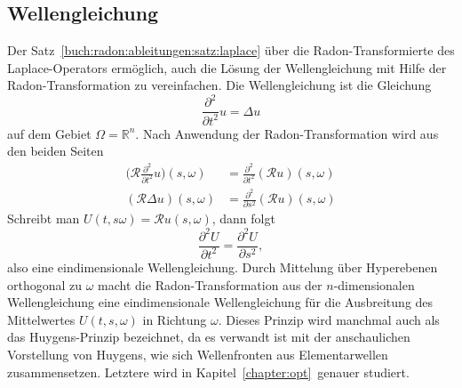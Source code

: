 \subsection{Wellengleichung
\label{buch:radon:ableitungen:subsection:wellengleichung}}
Der Satz~\ref{buch:radon:ableitungen:satz:laplace} über die
Radon-Transformierte des Laplace-Operators ermöglich, auch die
Lösung der Wellengleichung mit Hilfe der Radon-Transformation zu
vereinfachen.
Die Wellengleichung ist die Gleichung
\[
\frac{\partial^2}{\partial t^2}u = \Delta u
\]
auf dem Gebiet $\Omega=\mathbb{R}^n$.
Nach Anwendung der Radon-Transformation wird aus den beiden Seiten
\begin{align*}
\biggl(\mathscr{R}\frac{\partial^2}{\partial t^2}u\biggr)(s,\omega)
&=
\frac{\partial^2}{\partial t^2}(\mathscr{R}u)(s,\omega)
\\
(\mathscr{R}\Delta u)(s,\omega)
&=
\frac{\partial^2}{\partial s^2}(\mathscr{R}u)(s,\omega)
\end{align*}
Schreibt man $U(t,s\omega)=\mathscr{R}u(s,\omega)$, dann folgt
\[
\frac{\partial^2 U}{\partial t^2}
=
\frac{\partial^2 U}{\partial s^2},
\]
also eine eindimensionale Wellengleichung.
Durch Mittelung über Hyperebenen orthogonal zu $\omega$ macht
die Radon-Transformation aus der $n$-dimensionalen Wellengleichung
eine eindimensionale Wellengleichung für die Ausbreitung des
Mittelwertes $U(t,s,\omega)$ in Richtung $\omega$.
Dieses Prinzip wird manchmal auch als das Huygens-Prinzip 
bezeichnet, da es verwandt ist mit der anschaulichen Vorstellung
von Huygens, wie sich Wellenfronten aus Elementarwellen zusammensetzen.
Letztere wird in Kapitel~\ref{chapter:opt} genauer studiert.


